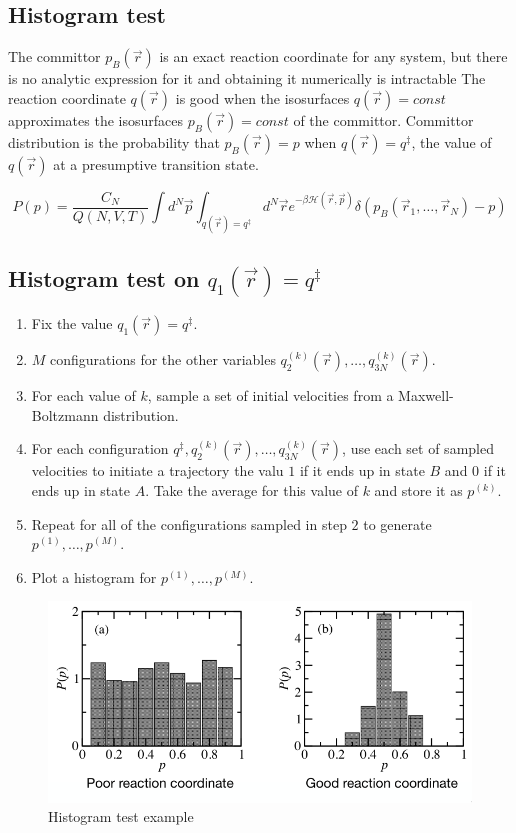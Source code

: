 	\subsection{Histogram test}
	The committor $p_B(\vec{r})$ is an exact reaction coordinate for any system, but there is no analytic expression for it and obtaining it numerically is intractable
	The reaction coordinate $q(\vec{r})$ is good when the isosurfaces $q(\vec{r}) = const$ approximates the isosurfaces $p_B(\vec{r})= const$ of the committor.
	Committor distribution is the probability that $p_B(\vec{r}) = p$ when $q(\vec{r}) = q^{\ddagger}$, the value of $q(\vec{r})$ at a presumptive transition state.

	$$P(p) = \frac{C_N}{Q(N, V, T)}\int d^N\vec{p}\int_{q(\vec{r})=q^{\ddagger}}d^N\vec{r}e^{-\beta\mathcal{H}(\vec{r}, \vec{p})}\delta(p_B(\vec{r}_1, \dots, \vec{r}_N)-p)$$



	\subsection{Histogram test on $q_1(\vec{r}) = q^{\ddagger}$}

	\begin{enumerate}
		\item Fix the value $q_1(\vec{r}) = q^{\ddagger}$.
		\item $M$ configurations for the other variables $q_2^{(k)}(\vec{r}), \dots, q_{3N}^{(k)}(\vec{r})$.
		\item For each value of $k$, sample a set of initial velocities from a Maxwell-Boltzmann distribution.
		\item For each configuration $q^{\ddagger}, q_2^{(k)}(\vec{r}), \dots, q_{3N}^{(k)}(\vec{r})$, use each set of sampled velocities to initiate a trajectory the valu $1$ if it ends up in state $B$ and $0$ if it ends up in state $A$.
			Take the average for this value of $k$ and store it as $p^{(k)}$.
		\item Repeat for all of the configurations sampled in step $2$ to generate $p^{(1)}, \dots, p^{(M)}$.
		\item Plot a histogram for $p^{(1)}, \dots, p^{(M)}$.
	\end{enumerate}

	\begin{figure}[H]
		\includegraphics[width=\textwidth]{histogram-test}
		\caption{Histogram test example}
		\label{fig:histogram-test}
	\end{figure}
